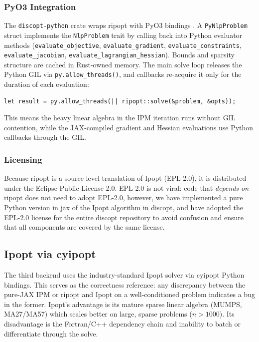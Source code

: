 \documentclass[12pt,preprint]{article}
\begin{document}
\subsubsection{PyO3 Integration}
\label{org-pyo3-integration}
The \texttt{discopt-python} crate wraps ripopt with PyO3 bindings \cite{pyo3}. A \texttt{PyNlpProblem} struct implements the \texttt{NlpProblem} trait by calling back into Python evaluator methods (\texttt{evaluate\_objective}, \texttt{evaluate\_gradient}, \texttt{evaluate\_constraints}, \texttt{evaluate\_jacobian}, \texttt{evaluate\_lagrangian\_hessian}). Bounds and sparsity structure are cached in Rust-owned memory. The main solve loop releases the Python GIL via \texttt{py.allow\_threads()}, and callbacks re-acquire it only for the duration of each evaluation:


\begin{verbatim}
let result = py.allow_threads(|| ripopt::solve(&problem, &opts));
\end{verbatim}

This means the heavy linear algebra in the IPM iteration runs without GIL contention, while the JAX-compiled gradient and Hessian evaluations use Python callbacks through the GIL.

\subsubsection{Licensing}
\label{org-licensing}
Because ripopt is a source-level translation of Ipopt (EPL-2.0), it is distributed under the Eclipse Public License 2.0. EPL-2.0 is not viral: code that \textit{depends on} ripopt does not need to adopt EPL-2.0, however, we have implemented a pure Python version in jax of the Ipopt algorithm in discopt, and have adopted the EPL-2.0 license for the entire discopt repository to avoid confusion and ensure that all components are covered by the same license.

\subsection{Ipopt via cyipopt}
\label{org-ipopt-via-cyipopt}
The third backend uses the industry-standard Ipopt solver \cite{Wachter2006} via cyipopt Python bindings. This serves as the correctness reference: any discrepancy between the pure-JAX IPM or ripopt and Ipopt on a well-conditioned problem indicates a bug in the former. Ipopt's advantage is its mature sparse linear algebra (MUMPS, MA27/MA57) which scales better on large, sparse problems ($n > 1000$). Its disadvantage is the Fortran/C++ dependency chain and inability to batch or differentiate through the solve.
\end{document}
